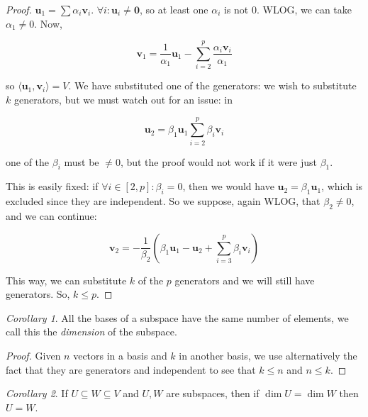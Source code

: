 \documentclass[12pt,a4paper]{report}
\numberwithin{equation}{section}
\theoremstyle{definition}
\theoremstyle{remark}
\newtheorem{corollary}{Corollary}[theorem]
\begin{document}
\begin{proof}
$\mathbf{u}_1 = \sum \alpha_i \mathbf{v}_i$. $\forall i: \mathbf{u}_i \neq \mathbf{0}$, so at least one $\alpha_i$ is not 0. WLOG, we can take $\alpha_1 \neq 0$. Now,

\begin{equation}
\mathbf{v}_1 = \frac{1}{\alpha_1} \mathbf{u}_1 - \sum_{i=2}^p \frac{\alpha_i \mathbf{v}_i}{\alpha_1}
\end{equation}

so $\langle \mathbf{u}_1, \mathbf{v}_i \rangle =V$. We have substituted one of the generators: we wish to substitute $k$ generators, but we must watch out for an issue: in

\begin{equation}
\mathbf{u}_2 = \beta_1 \mathbf{u}_1 \sum_{i=2}^p \beta_i \mathbf{v}_i
\end{equation} 

one of the $\beta_i$ must be $\neq 0$, but the proof would not work if it were just $\beta_1$.

This is easily fixed: if $\forall i \in [2, p]: \beta_i =0$, then we would have $\mathbf{u}_2 = \beta_1 \mathbf{u}_1$, which is excluded since they are independent. So we suppose, again WLOG, that $\beta_2 \neq 0$, and we can continue:

\begin{equation}
\mathbf{v}_2 = -\frac 1{\beta_2}\left( \beta_1 \mathbf{u}_1 - \mathbf{u}_2 + \sum_{i=3}^p \beta_i \mathbf{v}_i \right)
\end{equation}

This way, we can substitute $k$ of the $p$ generators and we will still have generators. So, $k\leq p$.
\end{proof}

\begin{corollary}
All the bases of a subspace have the same number of elements, we call this the \emph{dimension} of the subspace.
\end{corollary}

\begin{proof}
Given $n$ vectors in a basis and $k$ in another basis, we use alternatively the fact that they are generators and independent to see that $k\leq n$ and $n\leq k$.
\end{proof}

\begin{corollary}
If $U\subseteq W \subseteq V$ and $U, W$ are subspaces, then if $\dim U = \dim W$ then $U=W$.
\end{corollary}
\end{document}
